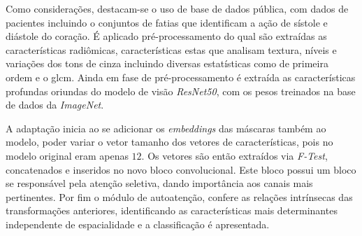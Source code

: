 Como considerações, destacam-se o uso de base de dados pública, com dados de pacientes incluindo o conjuntos de fatias que identificam a ação de sístole e diástole do coração. É aplicado pré-processamento do qual são extraídas as características radiômicas, características estas que analisam textura, níveis e variações dos tons de cinza incluindo diversas estatísticas como de primeira ordem e o \gls{glcm}. Ainda em fase de pré-processamento é extraída as características profundas oriundas do modelo de visão \textit{ResNet50}, com os pesos treinados na base de dados da \textit{ImageNet}. 

A adaptação inicia ao se adicionar os \textit{embeddings} das máscaras também ao modelo, poder variar o vetor tamanho dos vetores de características, pois no modelo original eram apenas $12$. Os vetores são então extraídos via \textit{F-Test}, concatenados e inseridos no novo bloco convolucional. Este bloco possui um bloco \gls{se} responsável pela atenção seletiva, dando importância aos canais mais pertinentes. Por fim o módulo de autoatenção, confere as relações intrínsecas das transformações anteriores, identificando as características mais determinantes independente de espacialidade e a classificação é apresentada.